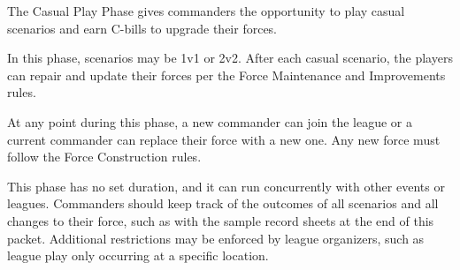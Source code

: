 The Casual Play Phase gives commanders the opportunity to play casual scenarios and earn C-bills to upgrade their forces.

In this phase, scenarios may be 1v1 or 2v2.
After each casual scenario, the players can repair and update their forces per the Force Maintenance and Improvements rules.

At any point during this phase, a new commander can join the league or a current commander can replace their force with a new one.
Any new force must follow the Force Construction rules.

This phase has no set duration, and it can run concurrently with other events or leagues.
Commanders should keep track of the outcomes of all scenarios and all changes to their force, such as with the sample record sheets at the end of this packet.
Additional restrictions may be enforced by league organizers, such as league play only occurring at a specific location.

